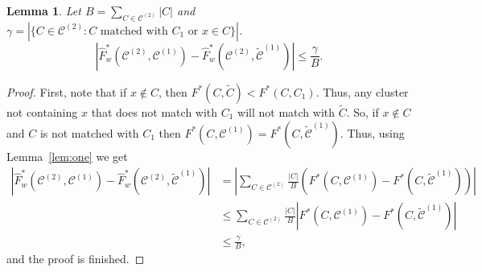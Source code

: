 \documentclass[11pt]{article}
\newtheorem{lem}[thm]{Lemma}
\theoremstyle{remark}
\newcommand\cCone{\mathcal{C}^{(1)}}
\newcommand\tcCone{\tilde{\mathcal{C}}^{(1)}}
\newcommand\cCtwo{\mathcal{C}^{(2)}}
\begin{document}
\begin{lem} \label{lem:three}
    Let $B = \sum_{C \in \cCtwo} |C|$ and $\gamma = \left| \{ C \in \cCtwo : C \text{ matched with } C_1 \text{ or } x \in C\} \right|$.
    \begin{equation*}
        \left| \hat{F}^*_w(\cCtwo, \cCone) - \hat{F}^*_w(\cCtwo, \tcCone) \right| \leq \frac{ \gamma }{B}.
    \end{equation*}
\end{lem}
\begin{proof}
    First, note that if $x \not \in C$, then $F^*(C, \tilde{C}) < F^*(C, C_1)$.
    Thus, any cluster not containing $x$ that does not match with $C_1$ will not match with $\tilde{C}$.
    So, if $ x \not \in C$ and $C$ is not matched with $C_1$ then $F^*(C, \cCone) = F^*(C, \tcCone)$.
    Thus, using Lemma~\ref{lem:one} we get
    \begin{align*}
        \left| \hat{F}^*_w(\cCtwo, \cCone) - \hat{F}^*_w(\cCtwo, \tcCone) \right| &= \left| \sum_{C \in \cCtwo} \frac{|C|}{B} \left( F^*(C, \cCone) - F^*(C, \tcCone) \right) \right| \\
        & \leq \sum_{C \in \cCtwo} \frac{|C|}{B} \left| F^*(C, \cCone) - F^*(C, \tcCone) \right| \\
        & \leq \frac{ \gamma }{B},
    \end{align*}
    and the proof is finished.
\end{proof}
\end{document}

